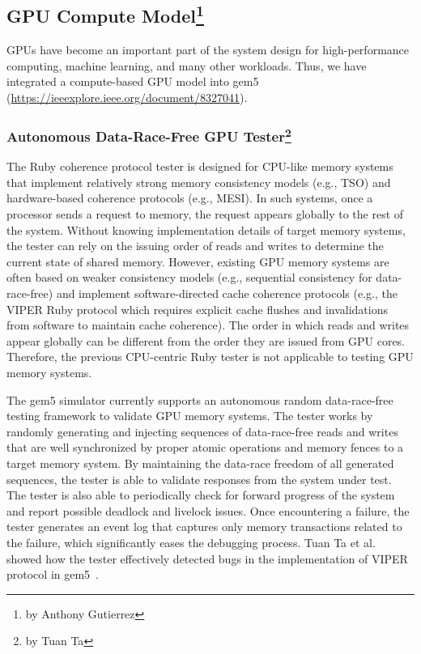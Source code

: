 \subsection[GPU Compute Model]{GPU Compute Model\footnote{by Anthony Gutierrez}}
\label{sec:gpu}

GPUs have become an important part of the system design for high-performance computing, machine learning, and many other workloads.
Thus, we have integrated a compute-based GPU model into gem5~\cite{GutierrezBeckmann2018-amdAPU} (\url{https://ieeexplore.ieee.org/document/8327041}).

\subsubsection[Autonomous Data-Race-Free GPU Tester]{Autonomous Data-Race-Free GPU Tester\footnote{by Tuan Ta}}

The Ruby coherence protocol tester is designed for CPU-like memory systems that implement relatively strong memory consistency models (e.g., TSO) and hardware-based coherence protocols (e.g., MESI).
In such systems, once a processor sends a request to memory, the request appears globally to the rest of the system.
Without knowing implementation details of target memory systems, the tester can rely on the issuing order of reads and writes to determine the current state of shared memory.
However, existing GPU memory systems are often based on weaker consistency models (e.g., sequential consistency for data-race-free) and implement software-directed cache coherence protocols (e.g., the VIPER Ruby protocol which requires explicit cache flushes and invalidations from software to maintain cache coherence).
The order in which reads and writes appear globally can be different from the order they are issued from GPU cores.
Therefore, the previous CPU-centric Ruby tester is not applicable to testing GPU memory systems.

The gem5 simulator currently supports an autonomous random data-race-free testing framework to validate GPU memory systems.
The tester works by randomly generating and injecting sequences of data-race-free reads and writes that are well synchronized by proper atomic operations and memory fences to a target memory system.
By maintaining the data-race freedom of all generated sequences, the tester is able to validate responses from the system under test.
The tester is also able to periodically check for forward progress of the system and report possible deadlock and livelock issues.
Once encountering a failure, the tester generates an event log that captures only memory transactions related to the failure, which significantly eases the debugging process.
Tuan Ta et al. showed how the tester effectively detected bugs in the implementation of VIPER protocol in gem5~\cite{Ta2019gputesting}.
